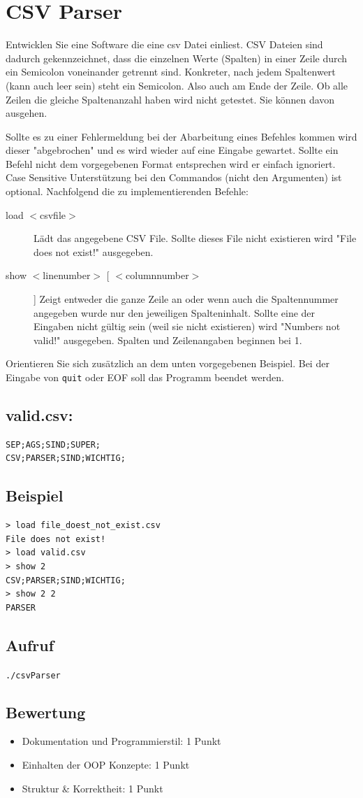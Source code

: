 \documentclass[a4paper,10pt]{article}
\begin{document}
\section*{CSV Parser}

Entwicklen Sie eine Software die eine csv Datei einliest. 
CSV Dateien sind dadurch gekennzeichnet, dass die einzelnen Werte (Spalten) in einer Zeile
durch ein Semicolon voneinander getrennt sind. Konkreter, nach jedem Spaltenwert (kann auch leer sein) steht ein Semicolon.
Also auch am Ende der Zeile. Ob alle Zeilen die gleiche Spaltenanzahl haben wird nicht getestet. Sie können davon ausgehen.

Sollte es zu einer Fehlermeldung bei der Abarbeitung eines Befehles kommen
wird dieser "abgebrochen" und es wird wieder auf eine Eingabe gewartet.
Sollte ein Befehl nicht dem vorgegebenen Format entsprechen wird er einfach ignoriert. Case Sensitive Unterstützung bei den Commandos (nicht den Argumenten) ist optional.
Nachfolgend die zu implementierenden Befehle:

\begin{description}
 \item[load $<$csvfile$>$] Lädt das angegebene CSV File. Sollte dieses File nicht existieren wird "File does not exist!" ausgegeben.
 \item[show $<$linenumber$>$ $[$ $<$columnnumber$>$]$ $] Zeigt entweder die ganze Zeile an oder wenn auch die Spaltennummer angegeben wurde nur den jeweiligen Spalteninhalt.
 Sollte eine der Eingaben nicht gültig sein (weil sie nicht existieren) wird "Numbers not valid!" ausgegeben. Spalten und Zeilenangaben beginnen bei 1.
\end{description}

Orientieren Sie sich zusätzlich an dem unten vorgegebenen Beispiel. Bei der Eingabe von \texttt{quit} oder EOF soll das Programm beendet werden.

\subsection*{valid.csv:}
\begin{verbatim}
SEP;AGS;SIND;SUPER;
CSV;PARSER;SIND;WICHTIG;
\end{verbatim}

\subsection*{Beispiel}
\begin{verbatim}
> load file_doest_not_exist.csv
File does not exist!
> load valid.csv
> show 2
CSV;PARSER;SIND;WICHTIG;
> show 2 2
PARSER
\end{verbatim}

\subsection*{Aufruf}
\texttt{./csvParser}

\subsection*{Bewertung}
\begin{itemize}
 \item Dokumentation und Programmierstil: 1 Punkt
 \item Einhalten der OOP Konzepte: 1 Punkt
 \item Struktur \& Korrektheit: 1 Punkt
\end{itemize}

\newpage
\end{document}
